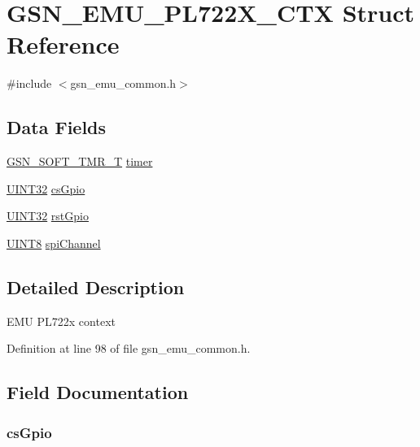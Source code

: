 \hypertarget{a00065}{
\section{GSN\_\-EMU\_\-PL722X\_\-CTX Struct Reference}
\label{a00065}
}


{\ttfamily \#include $<$gsn\_\-emu\_\-common.h$>$}

\subsection*{Data Fields}
\begin{DoxyCompactItemize}
\item 
\hyperlink{a00229}{GSN\_\-SOFT\_\-TMR\_\-T} \hyperlink{a00065_ae85406cd4c57a001e8a590bdb2163b65}{timer}
\item 
\hyperlink{a00660_gae1e6edbbc26d6fbc71a90190d0266018}{UINT32} \hyperlink{a00065_adfd676373ff6b4e1bd5139216f79ebe5}{csGpio}
\item 
\hyperlink{a00660_gae1e6edbbc26d6fbc71a90190d0266018}{UINT32} \hyperlink{a00065_a09beb351c65ecd0d64c843a49a29e215}{rstGpio}
\item 
\hyperlink{a00660_gab27e9918b538ce9d8ca692479b375b6a}{UINT8} \hyperlink{a00065_a83a2309a5073ea257cf95ec84fa387e5}{spiChannel}
\end{DoxyCompactItemize}


\subsection{Detailed Description}
EMU PL722x context 

Definition at line 98 of file gsn\_\-emu\_\-common.h.



\subsection{Field Documentation}
\hypertarget{a00065_adfd676373ff6b4e1bd5139216f79ebe5}{
\subsubsection[{csGpio}]{ {\bf csGpio}}}
\label{a00065_adfd676373ff6b4e1bd5139216f79ebe5}


